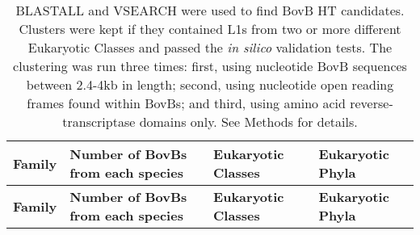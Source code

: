 {\footnotesize
	\begin{longtable}{| C{1.5cm} | L{8.4cm} | L{2.4cm} | L{2.4cm} |} 
		\caption{\footnotesize 
			BLASTALL and VSEARCH were used to find BovB HT candidates. 
			Clusters were kept if they contained L1s from two or more different Eukaryotic Classes and passed the \textit{in silico} validation tests. 
			The clustering was run three times: first, using nucleotide BovB sequences between 2.4-4kb in length; second, using nucleotide open reading frames found within BovBs; and third, using amino acid reverse-transcriptase domains only.
			See Methods for details. 
			\label{table:BovBhtfamiliesTable}} \\
		
		\hline \textbf{Family} & \textbf{Number of BovBs from each species} & \textbf{Eukaryotic Classes} & \textbf{Eukaryotic Phyla} \\ \hline 
		\endfirsthead %
		
		\hline \textbf{Family} & \textbf{Number of BovBs from each species} & \textbf{Eukaryotic Classes} & \textbf{Eukaryotic Phyla} \\ \hline 
		\endhead %
		

\end{longtable}}
